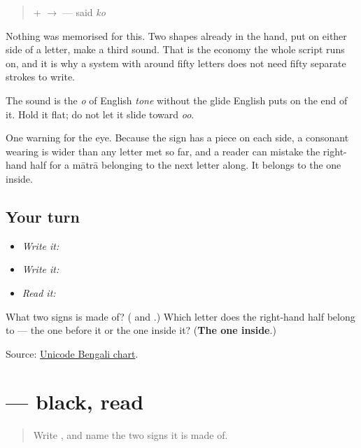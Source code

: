 \begin{quote}
\textbf{} + \textbf{} $\to$ \textbf{} — said \emph{ko}
\end{quote}

Nothing was memorised for this. Two shapes already in the hand, put on either side of a letter, make a third sound. That is the economy the whole script runs on, and it is why a system with around fifty letters does not need fifty separate strokes to write.

The sound is the \emph{o} of English \emph{tone} without the glide English puts on the end of it. Hold it flat; do not let it slide toward \emph{oo}.

One warning for the eye. Because the sign has a piece on each side, a consonant wearing \textbf{} is wider than any letter met so far, and a reader can mistake the right-hand half for a mātrā belonging to the next letter along. It belongs to the one inside.

\subsection*{Your turn}
\begin{itemize}
\raggedright
  \item \emph{Write it:} 
  \item \emph{Write it:} 
  \item \emph{Read it:} 
\end{itemize}

\begin{tcolorbox}[breakable,colback=teal!4,colframe=teal!35!black,title={Before you move on}]
What two signs is \textbf{} made of? (\textbf{} and \textbf{}.) Which letter does the right-hand half belong to — the one before it or the one inside it? (\textbf{The one inside}.)

Source: \href{https://www.unicode.org/charts/PDF/U0980.pdf}{Unicode Bengali chart}.
\end{tcolorbox}
\section[kālo]{ — black, read}

\label{lesson:BN-W03-kalo-read}



\begin{quote}
Write \textbf{}, and name the two signs it is made of.
\end{quote}

